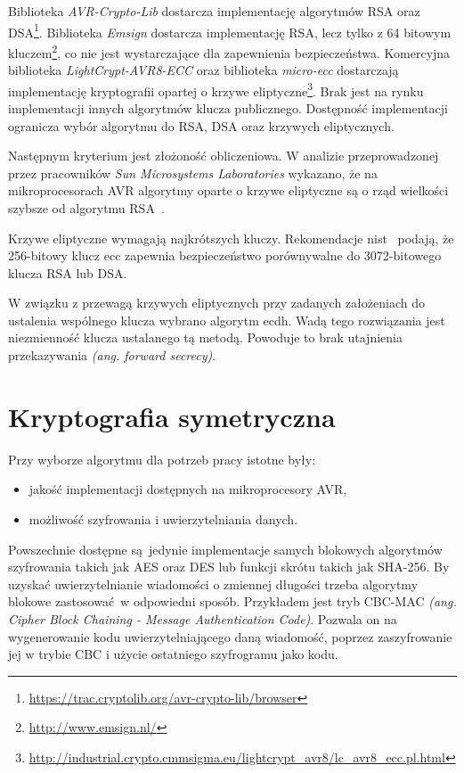 Biblioteka \emph{AVR-Crypto-Lib} dostarcza implementację algorytmów RSA oraz DSA\footnote{\url{https://trac.cryptolib.org/avr-crypto-lib/browser}}. Biblioteka \emph{Emsign} dostarcza implementację RSA, lecz tylko z 64 bitowym kluczem\footnote{\url{http://www.emsign.nl/}}, co nie jest wystarczające dla zapewnienia bezpieczeństwa. Komercyjna biblioteka \emph{LightCrypt-AVR8-ECC} oraz biblioteka \emph{micro-ecc} dostarczają implementację kryptografii opartej o krzywe eliptyczne\footnote{\url{http://industrial.crypto.cmmsigma.eu/lightcrypt_avr8/lc_avr8_ecc.pl.html}}. Brak jest na rynku implementacji innych algorytmów klucza publicznego. Dostępność implementacji ogranicza wybór algorytmu do RSA, DSA oraz krzywych eliptycznych.

Następnym kryterium jest złożoność obliczeniowa. W analizie przeprowadzonej przez pracowników \emph{Sun Microsystems Laboratories} wykazano, że na mikroprocesorach AVR algorytmy oparte o krzywe eliptyczne są o rząd wielkości szybsze od algorytmu RSA~\cite{Gura2004}.

Krzywe eliptyczne wymagają najkrótszych kluczy. Rekomendacje \gls{nist}~\cite{Nist} podają, że 256-bitowy klucz \gls{ecc} zapewnia bezpieczeństwo porównywalne do 3072-bitowego klucza RSA lub DSA.

W związku z przewagą krzywych eliptycznych przy zadanych założeniach do ustalenia wspólnego klucza wybrano algorytm \gls{ecdh}. Wadą tego rozwiązania jest niezmienność klucza ustalanego tą metodą. Powoduje to brak utajnienia przekazywania \emph{(ang. forward secrecy)}.

\section{Kryptografia symetryczna}
\label{sec:kryptoSym}

Przy wyborze algorytmu dla potrzeb pracy istotne były:

\begin{itemize}
\item jakość implementacji dostępnych na mikroprocesory AVR,
\item możliwość szyfrowania i uwierzytelniania danych.
\end{itemize}

Powszechnie dostępne są jedynie implementacje samych blokowych algorytmów szyfrowania takich jak AES oraz DES lub funkcji skrótu takich jak SHA-256. By uzyskać uwierzytelnianie wiadomości o zmiennej długości trzeba algorytmy blokowe zastosować w odpowiedni sposób. Przykładem jest tryb CBC-MAC {\itshape (ang. Cipher Block Chaining - Message Authentication Code)}. Pozwala on na wygenerowanie kodu uwierzytelniającego daną wiadomość, poprzez zaszyfrowanie jej w trybie CBC i użycie ostatniego szyfrogramu jako kodu.

